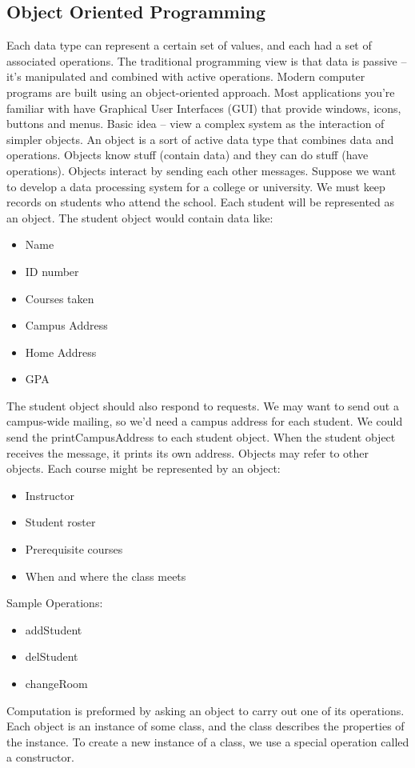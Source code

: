 \documentclass[12pt,a4paper,final,twoside,onecolumn,titlepage]{book}
\begin{document}
\subsection{Object Oriented Programming}
Each data type can represent a certain set of values, and each had a set of associated operations. The traditional programming view is that data is passive – it’s manipulated and combined with active operations. Modern computer programs are built using an object-oriented approach. Most applications you’re familiar with have Graphical User Interfaces (GUI) that provide windows, icons, buttons and menus. Basic idea – view a complex system as the interaction of simpler objects. An object is a sort of active data type that combines data and operations. Objects know stuff (contain data) and they can do stuff (have operations). Objects interact by sending each other messages.
Suppose we want to develop a data processing system for a college or university. We must keep records on students who attend the school. Each student will be represented as an object. The student object would contain data like:
\begin{itemize}
\item Name
\item ID number
\item Courses taken
\item Campus Address
\item Home Address
\item GPA
\end{itemize}
The student object should also respond to requests. We may want to send out a campus-wide mailing, so we’d need a campus address for each student. We could send the printCampusAddress to each student object. When the student object receives the message, it prints its own address. Objects may refer to other objects. Each course might be represented by an object:
\begin{itemize}
\item Instructor
\item Student roster
\item Prerequisite courses
\item When and where the class meets
\end{itemize}
Sample Operations:
\begin{itemize}
\item addStudent
\item delStudent
\item changeRoom
\end{itemize}
Computation is preformed by asking an object to carry out one of its operations. Each object is an instance of some class, and the class describes the properties of the instance.  To create a new instance of a class, we use a special operation called a constructor.
\end{document}
